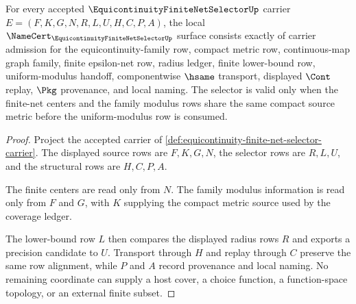 \begin{theorem}
\label{thm:equicontinuity-finite-net-selector-namecert-obligations}
For every accepted $\EquicontinuityFiniteNetSelectorUp$ carrier $E=(F,K,G,N,R,L,U,H,C,P,A)$, the local $\NameCert_{\EquicontinuityFiniteNetSelectorUp}$ surface consists exactly of carrier admission for the equicontinuity-family row, compact metric row, continuous-map graph family, finite epsilon-net row, radius ledger, finite lower-bound row, uniform-modulus handoff, componentwise $\hsame$ transport, displayed $\Cont$ replay, $\Pkg$ provenance, and local naming. The selector is valid only when the finite-net centers and the family modulus rows share the same compact source metric before the uniform-modulus row is consumed.
\end{theorem}
\begin{proof}
Project the accepted carrier of \autoref{def:equicontinuity-finite-net-selector-carrier}. The displayed source rows are $F,K,G,N$, the selector rows are $R,L,U$, and the structural rows are $H,C,P,A$.

The finite centers are read only from $N$. The family modulus information is read only from $F$ and $G$, with $K$ supplying the compact metric source used by the coverage ledger.

The lower-bound row $L$ then compares the displayed radius rows $R$ and exports a precision candidate to $U$. Transport through $H$ and replay through $C$ preserve the same row alignment, while $P$ and $A$ record provenance and local naming. No remaining coordinate can supply a host cover, a choice function, a function-space topology, or an external finite subset.
\end{proof}

